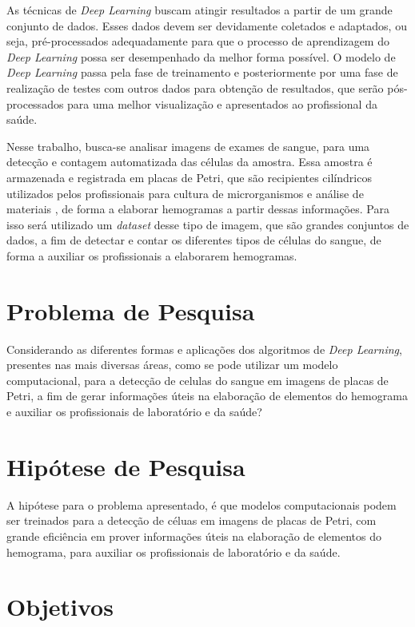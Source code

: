 As técnicas de \emph{Deep Learning} buscam atingir resultados a partir de um grande conjunto de dados. Esses dados devem ser devidamente coletados e adaptados, ou seja, pré-processados adequadamente para que o processo de aprendizagem do \emph{Deep Learning} possa ser desempenhado da melhor forma possível. O modelo de \emph{Deep Learning} passa pela fase de treinamento e posteriormente por uma fase de realização de testes com outros dados para obtenção de resultados, que serão pós-processados para uma melhor visualização e apresentados ao profissional da saúde.

Nesse trabalho, busca-se analisar imagens de exames de sangue, para uma detecção e contagem automatizada das células da amostra. Essa amostra é armazenada e registrada em placas de Petri, que são recipientes cilíndricos utilizados pelos profissionais para cultura de microrganismos e análise de materiais \cite{petri}, de forma a elaborar hemogramas a partir dessas informações. Para isso será utilizado um \emph{dataset} desse tipo de imagem, que são grandes conjuntos de dados, a fim de detectar e contar os diferentes tipos de células do sangue, de forma a auxiliar os profissionais a elaborarem hemogramas.

\section{Problema de Pesquisa}
\label{sec:problema}
Considerando as diferentes formas e aplicações dos algoritmos de \emph{Deep Learning}, presentes nas mais diversas áreas, como se pode utilizar um modelo computacional, para a detecção de celulas do sangue em imagens de placas de Petri, a fim de gerar informações úteis na elaboração de elementos do hemograma e auxiliar os profissionais de laboratório e da saúde?

\section{Hipótese de Pesquisa}
\label{sec:hipotese}
A hipótese para o problema apresentado, é que modelos computacionais podem ser treinados para a detecção de céluas em imagens de placas de Petri, com grande eficiência em prover informações úteis na elaboração de elementos do hemograma, para auxiliar os profissionais de laboratório e da saúde.

\section{Objetivos}
\label{sec:objetivos}

